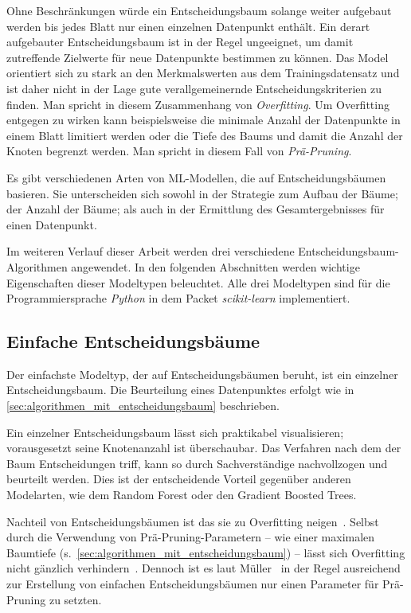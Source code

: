 Ohne Beschränkungen würde ein Entscheidungsbaum solange weiter aufgebaut werden bis jedes Blatt nur einen einzelnen Datenpunkt enthält. Ein derart aufgebauter Entscheidungsbaum ist in der Regel ungeeignet, um damit zutreffende Zielwerte für neue Datenpunkte bestimmen zu können. Das Model orientiert sich zu stark an den Merkmalswerten aus dem Trainingsdatensatz und ist daher nicht in der Lage gute verallgemeinernde Entscheidungskriterien zu finden. Man spricht in diesem Zusammenhang von \textit{Overfitting}. Um Overfitting entgegen zu wirken kann beispielsweise die minimale Anzahl der Datenpunkte in einem Blatt limitiert werden oder die Tiefe des Baums und damit die Anzahl der Knoten begrenzt werden. Man spricht in diesem Fall von \textit{Prä-Pruning}.

Es gibt verschiedenen Arten von ML-Modellen, die auf Entscheidungsbäumen basieren. Sie unterscheiden sich sowohl in der Strategie zum Aufbau der Bäume; der Anzahl der Bäume; als auch in der Ermittlung des Gesamtergebnisses für einen Datenpunkt. 

Im weiteren Verlauf dieser Arbeit werden drei verschiedene Entscheidungsbaum-Algorithmen angewendet. In den folgenden Abschnitten werden wichtige Eigenschaften dieser Modeltypen beleuchtet. Alle drei Modeltypen sind für die Programmiersprache \textit{Python} in dem Packet \textit{scikit-learn} implementiert.
\subsection{Einfache Entscheidungsbäume}
\label{sec:einfache_entscheidungsbaeume}
Der einfachste Modeltyp, der auf Entscheidungsbäumen beruht, ist ein einzelner Entscheidungsbaum. Die Beurteilung eines Datenpunktes erfolgt wie in \cref{sec:algorithmen_mit_entscheidungsbaum} beschrieben.

Ein einzelner Entscheidungsbaum lässt sich praktikabel visualisieren; vorausgesetzt seine Knotenanzahl ist überschaubar. Das Verfahren nach dem der Baum Entscheidungen triff, kann so durch Sachverständige nachvollzogen und beurteilt werden. Dies ist der entscheidende Vorteil gegenüber anderen Modelarten, wie dem Random Forest oder den Gradient Boosted Trees.

Nachteil von Entscheidungsbäumen ist das sie zu Overfitting neigen~\cite[S.~80]{Muller.2017}. Selbst durch die Verwendung von Prä-Pruning-Parametern -- wie einer maximalen Baumtiefe (s.~\cref{sec:algorithmen_mit_entscheidungsbaum}) -- lässt sich Overfitting nicht gänzlich verhindern~\cite[S.~80]{Muller.2017}. Dennoch ist es laut Müller~\cite[S.~79]{Muller.2017} in der Regel ausreichend zur Erstellung von einfachen Entscheidungsbäumen nur einen Parameter für Prä-Pruning zu setzten.
